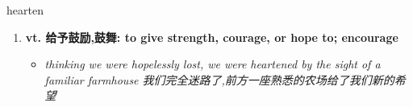 
\begin{frame}
{\huge hearten}
\begin{center}
\begin{enumerate}\Large
  \item \textbf{vt. 给予鼓励,鼓舞: to give strength, courage, or hope to; encourage}
  \begin{itemize}
    \item \em{\Large{thinking we were hopelessly lost, we were heartened by the sight of a familiar farmhouse 我们完全迷路了,前方一座熟悉的农场给了我们新的希望}}
  \end{itemize}
\end{enumerate}
\end{center}
\end{frame}
